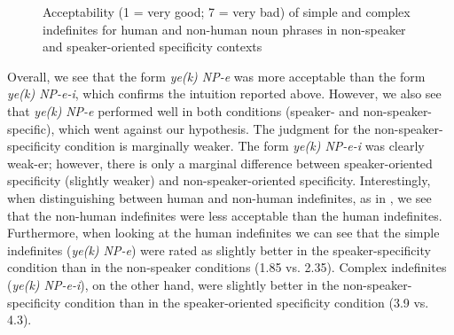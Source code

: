 \documentclass[output=paper]{langsci/langscibook}
\begin{document}
\begin{figure}


\dataset
{}
\caption{Acceptability (1 = very good; 7 = very bad) of simple and complex indefinites for human and non-human noun phrases in non-speaker and speaker-oriented specificity contexts}\label{4fig:2}
\end{figure}


{
\largerpage
Overall, we see that the form {\emph{ye(k) NP-e}} was more acceptable than the form {\emph{ye(k) NP-e-i}}, which confirms the intuition reported above. However, we also see that {\emph{ye(k)}} \mbox{\emph{NP-e}} performed well in both conditions (speaker- and non-speaker-specific), which went against our hypothesis. The judgment for the non-speaker-specificity condition is marginally weaker. The form {\emph{ye(k) NP-e-i}} was clearly weak-er; however, there is only a marginal difference between speaker-oriented specificity (slightly weaker) and non-speaker-oriented specificity. Interestingly, when distinguishing
between human and non-human indefinites, as in , we see that the non-human indefinites were less acceptable than the human indefinites. Furthermore, when looking at the human indefinites we can see that the simple indefinites ({\emph{ye(k) NP-e}}) were rated as slightly better in the speaker-specificity condition than in the non-speaker conditions (1.85 vs. 2.35).
\largerpage
Complex indefinites ({\emph{ye(k) NP-e-i}}), on the other hand, were slightly better in the non-speaker-specificity condition than in the speaker-oriented specificity condition (3.9 vs. 4.3).
}
\end{document}
